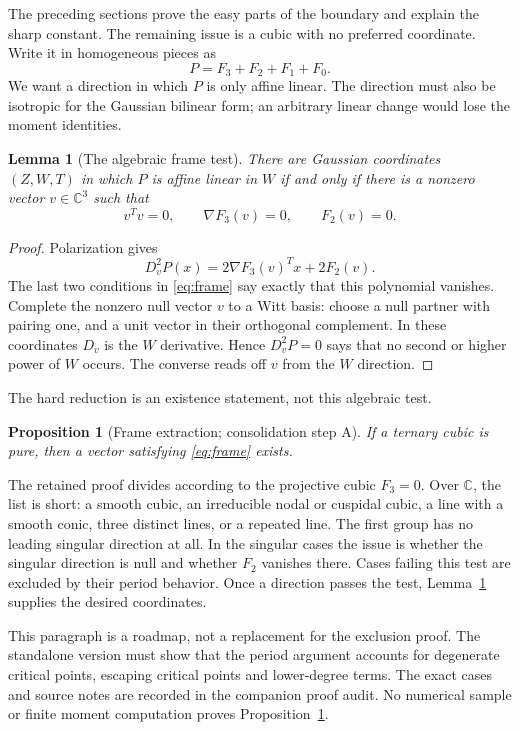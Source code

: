 \documentclass[11pt]{article}
\newtheorem{proposition}[theorem]{Proposition}
\newtheorem{lemma}[theorem]{Lemma}
\theoremstyle{definition}\newtheorem{definition}[theorem]{Definition}
\theoremstyle{remark}\newtheorem{remark}[theorem]{Remark}
\newcommand{\C}{\mathbb C}
\begin{document}
The preceding sections prove the easy parts of the boundary and explain
the sharp constant. The remaining issue is a cubic with no preferred
coordinate. Write it in homogeneous pieces as
\[
 P=F_3+F_2+F_1+F_0.
\]
We want a direction in which $P$ is only affine linear. The direction
must also be isotropic for the Gaussian bilinear form; an arbitrary
linear change would lose the moment identities.

\begin{lemma}[The algebraic frame test]\label{lem:frame}
There are Gaussian coordinates $(Z,W,T)$ in which $P$ is affine linear
in $W$ if and only if there is a nonzero vector $v\in\C^3$ such that
\begin{equation}\label{eq:frame}
 v^Tv=0,\qquad \nabla F_3(v)=0,\qquad F_2(v)=0.
\end{equation}
\end{lemma}
\begin{proof}
Polarization gives
\[
 D_v^2P(x)=2\nabla F_3(v)^Tx+2F_2(v).
\]
The last two conditions in \eqref{eq:frame} say exactly that this
polynomial vanishes. Complete the nonzero null vector $v$ to a Witt
basis: choose a null partner with pairing one, and a unit vector in
their orthogonal complement. In these coordinates $D_v$ is the $W$
derivative. Hence $D_v^2P=0$ says that no second or higher power of
$W$ occurs. The converse reads off $v$ from the $W$ direction.
\end{proof}

The hard reduction is an existence statement, not this algebraic test.

\begin{proposition}[Frame extraction; consolidation step A]\label{prop:frameextract}
If a ternary cubic is pure, then a vector satisfying
\eqref{eq:frame} exists.
\end{proposition}

The retained proof divides according to the projective cubic $F_3=0$.
Over $\C$, the list is short: a smooth cubic, an irreducible nodal or
cuspidal cubic, a line with a smooth conic, three distinct lines, or a
repeated line. The first group has no leading singular direction at
all. In the singular cases the issue is whether the singular direction
is null and whether $F_2$ vanishes there. Cases failing this test are
excluded by their period behavior. Once a direction passes the test,
Lemma~\ref{lem:frame} supplies the desired coordinates.

This paragraph is a roadmap, not a replacement for the exclusion proof.
The standalone version must show that the period argument accounts for
degenerate critical points, escaping critical points and lower-degree
terms. The exact cases and source notes are recorded in the companion
proof audit. No numerical sample or finite moment computation proves
Proposition~\ref{prop:frameextract}.
\end{document}

